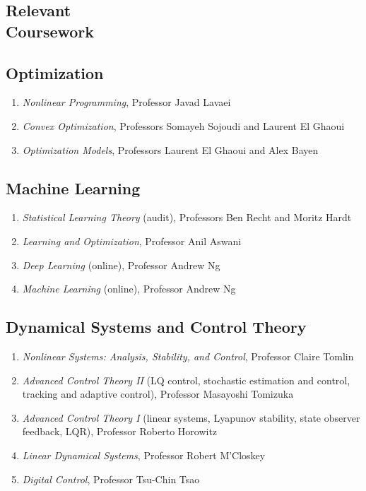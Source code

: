 \documentclass[11pt]{article}
\newcommand{\subsectionskip}{\baselineskip}	%
\begin{document}
	\begin{coursework}
		\section{\texorpdfstring{Relevant \\[\baselineskip] Coursework}{Relevant Coursework}}
		\hfill\vspace*{-2\baselineskip}
		
		\subsection{Optimization}
		\begin{enumerate}[label={\arabic*.}]
			\item \textit{Nonlinear Programming}, Professor Javad Lavaei
			\item \textit{Convex Optimization}, Professors Somayeh Sojoudi and Laurent El Ghaoui
			\item \textit{Optimization Models}, Professors Laurent El Ghaoui and Alex Bayen
		\end{enumerate}
		
		\vspace*{\subsectionskip}
		
		\subsection{Machine Learning}
		\begin{enumerate}[label=\arabic*.]
			\item \textit{Statistical Learning Theory} (audit), Professors Ben Recht and Moritz Hardt
			\item \textit{Learning and Optimization}, Professor Anil Aswani
			\item \textit{Deep Learning} (online), Professor Andrew Ng
			\item \textit{Machine Learning} (online), Professor Andrew Ng
		\end{enumerate}
		
		\vspace*{\subsectionskip}
		
		\subsection{Dynamical Systems and Control Theory}
		\begin{enumerate}[label=\arabic*.]
			\item \textit{Nonlinear Systems: Analysis, Stability, and Control}, Professor Claire Tomlin
			\item \textit{Advanced Control Theory II} (LQ control, stochastic estimation and control, tracking and adaptive control), Professor Masayoshi Tomizuka
			\item \textit{Advanced Control Theory I} (linear systems, Lyapunov stability, state observer feedback, LQR), Professor Roberto Horowitz
			\item \textit{Linear Dynamical Systems}, Professor Robert M'Closkey
			\item \textit{Digital Control}, Professor Tsu-Chin Tsao
		\end{enumerate}
		

\end{coursework}
\end{document}
